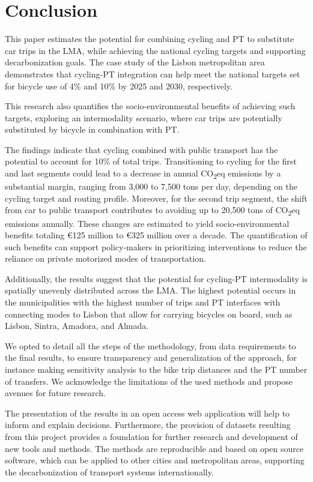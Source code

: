 \documentclass[review, doubleblind, 3p,
authoryear]{elsarticle} %
\begin{document}
\section{Conclusion}\label{Conclusions}

This paper estimates the potential for combining cycling and PT to
substitute car trips in the LMA, while achieving the national cycling
targets and supporting decarbonization goals. The case study of the
Lisbon metropolitan area demonstrates that cycling-PT integration can
help meet the national targets set for bicycle use of 4\% and 10\% by
2025 and 2030, respectively.

This research also quantifies the socio-environmental benefits of
achieving such targets, exploring an intermodality scenario, where car
trips are potentially substituted by bicycle in combination with PT.

The findings indicate that cycling combined with public transport has
the potential to account for 10\% of total trips. Transitioning to
cycling for the first and last segments could lead to a decrease in
annual CO\textsubscript{2}eq emissions by a substantial margin, ranging
from 3,000 to 7,500 tons per day, depending on the cycling target and
routing profile. Moreover, for the second trip segment, the shift from
car to public transport contributes to avoiding up to 20,500 tons of
CO\textsubscript{2}eq emissions annually. These changes are estimated to
yield socio-environmental benefits totaling €125 million to €325 million
over a decade. The quantification of such benefits can support
policy-makers in prioritizing interventions to reduce the reliance on
private motorized modes of transportation.

Additionally, the results suggest that the potential for cycling-PT
intermodality is spatially unevenly distributed across the LMA. The
highest potential occurs in the municipalities with the highest number
of trips and PT interfaces with connecting modes to Lisbon that allow
for carrying bicycles on board, such as Lisbon, Sintra, Amadora, and
Almada.

We opted to detail all the steps of the methodology, from data
requirements to the final results, to ensure transparency and
generalization of the approach, for instance making sensitivity analysis
to the bike trip distances and the PT number of transfers. We
acknowledge the limitations of the used methods and propose avenues for
future research.

The presentation of the results in an open access web application will
help to inform and explain decisions. Furthermore, the provision of
datasets resulting from this project provides a foundation for further
research and development of new tools and methods. The methods are
reproducible and based on open source software, which can be applied to
other cities and metropolitan areas, supporting the decarbonization of
transport systems internationally.
\end{document}

